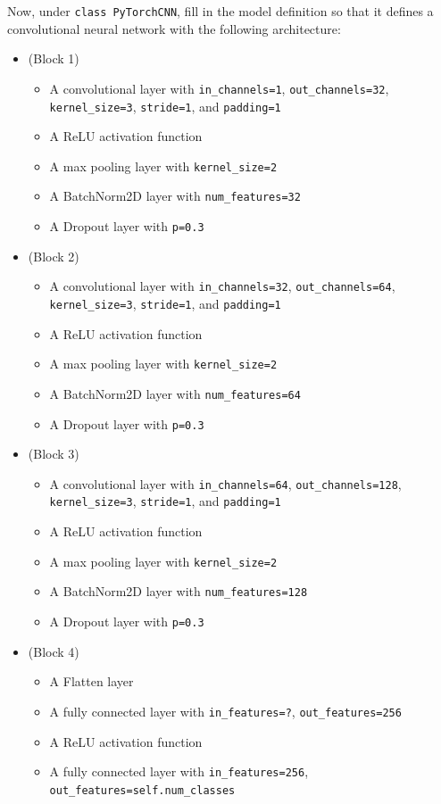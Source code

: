 \documentclass[11pt]{exam}
\begin{document}
Now, under \verb|class PyTorchCNN|, fill in the model definition so that it defines a convolutional neural network with the following architecture:
\begin{itemize}
    \item (Block 1)
    \begin{itemize}
        \item A convolutional layer with \verb|in_channels=1|,     
        \verb|out_channels=32|,\\
        \verb|kernel_size=3|, \verb|stride=1|, and \verb|padding=1|
        \item A ReLU activation function
        \item A max pooling layer with \verb|kernel_size=2|
        \item A BatchNorm2D layer with \verb|num_features=32|
        \item A Dropout layer with \verb|p=0.3|
    \end{itemize}
    \item (Block 2)
    \begin{itemize}
        \item A convolutional layer with \verb|in_channels=32|, 
        \verb|out_channels=64|,\\
        \verb|kernel_size=3|, \verb|stride=1|, and \verb|padding=1|
        \item A ReLU activation function
        \item A max pooling layer with \verb|kernel_size=2|
        \item A BatchNorm2D layer with \verb|num_features=64|
        \item A Dropout layer with \verb|p=0.3|
    \end{itemize}
    \item (Block 3)
    \begin{itemize}
        \item A convolutional layer with \verb|in_channels=64|,        
        \verb|out_channels=128|,\\
        \verb|kernel_size=3|, \verb|stride=1|, and \verb|padding=1|
        \item A ReLU activation function
        \item A max pooling layer with \verb|kernel_size=2|
        \item A BatchNorm2D layer with \verb|num_features=128|
        \item A Dropout layer with \verb|p=0.3|
    \end{itemize}
    \item (Block 4)
    \begin{itemize}
        \item A Flatten layer
        \item A fully connected layer with \verb|in_features=?|,     
        \verb|out_features=256|
        \item A ReLU activation function
        \item A fully connected layer with \verb|in_features=256|, 
        \verb|out_features=self.num_classes|
    \end{itemize}
\end{itemize}
\end{document}
